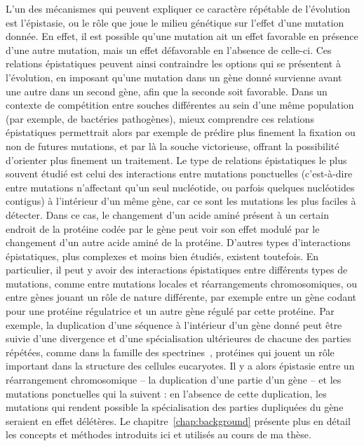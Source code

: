 L'un des mécanismes qui peuvent expliquer ce caractère répétable de l'évolution est l'épistasie, ou le rôle que joue le milieu génétique sur l'effet d'une mutation donnée.
En effet, il est possible qu'une mutation ait un effet favorable en présence d'une autre mutation, mais un effet défavorable en l'absence de celle-ci.
Ces relations épistatiques peuvent ainsi contraindre les options qui se présentent à l'évolution, en imposant qu'une mutation dans un gène donné survienne avant une autre dans un second gène, afin que la seconde soit favorable.
Dans un contexte de compétition entre souches différentes au sein d'une même population (par exemple, de bactéries pathogènes), mieux comprendre ces relations épistatiques permettrait alors par exemple de prédire plus finement la fixation ou non de futures mutations, et par là la souche victorieuse, offrant la possibilité d'orienter plus finement un traitement.
Le type de relations épistatiques le plus souvent étudié est celui des interactions entre mutations ponctuelles (c'est-à-dire entre mutations n'affectant qu'un seul nucléotide, ou parfois quelques nucléotides contigus) à l'intérieur d'un même gène, car ce sont les mutations les plus faciles à détecter.
Dans ce cas, le changement d'un acide aminé présent à un certain endroit de la protéine codée par le gène peut voir son effet modulé par le changement d'un autre acide aminé de la protéine.
D'autres types d'interactions épistatiques, plus complexes et moins bien étudiés, existent toutefois.
En particulier, il peut y avoir des interactions épistatiques entre différents types de mutations, comme entre mutations locales et réarrangements chromosomiques, ou entre gènes jouant un rôle de nature différente, par exemple entre un gène codant pour une protéine régulatrice et un autre gène régulé par cette protéine.
Par exemple, la duplication d'une séquence à l'intérieur d'un gène donné peut être suivie d'une divergence et d'une spécialisation ultérieures de chacune des parties répétées, comme dans la famille des spectrines~\citep{thomas1997}, protéines qui jouent un rôle important dans la structure des cellules eucaryotes.
Il y a alors épistasie entre un réarrangement chromosomique -- la duplication d'une partie d'un gène -- et les mutations ponctuelles qui la suivent : en l'absence de cette duplication, les mutations qui rendent possible la spécialisation des parties dupliquées du gène seraient en effet délétères.
Le chapitre~\ref{chap:background} présente plus en détail les concepts et méthodes introduits ici et utilisés au cours de ma thèse.

